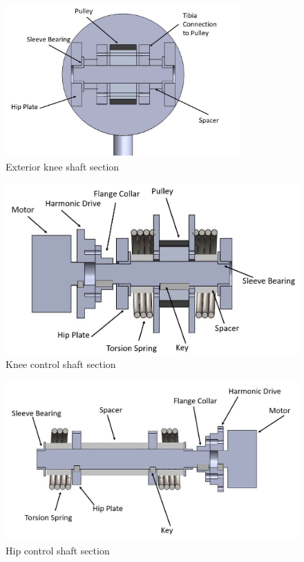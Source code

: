 \begin{figure}
    \centering
    \includegraphics[width=0.8\textwidth]{2_DetailedDesign/img/KneeShaft_a.JPG}
    \caption{Exterior knee shaft section}
    \label{fig:shaft_knee}
\end{figure}

\begin{figure}
    \centering
    \includegraphics[width=\textwidth]{2_DetailedDesign/img/HipKneeShaft_a.JPG}
    \caption{Knee control shaft section}
    \label{fig:shaft_hipknee}
\end{figure}

\begin{figure}
    \centering
    \includegraphics[width=\textwidth]{2_DetailedDesign/img/HipShaft_a.JPG}
    \caption{Hip control shaft section}
    \label{fig:shaft_hip}
\end{figure}


